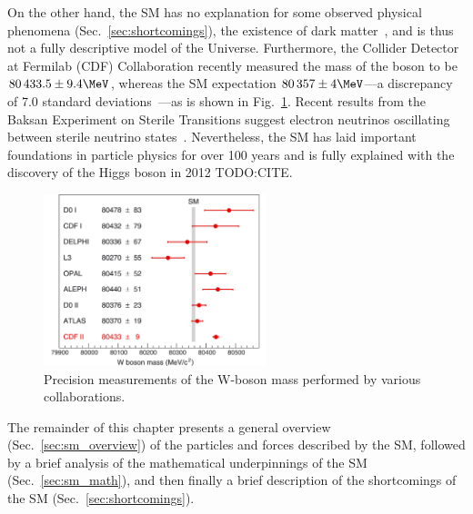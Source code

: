 On the other hand, the SM has no explanation for some observed physical phenomena (Sec.~\ref{sec:shortcomings}), \eg the existence of dark matter~\cite{particle_data_group_review_2020}, and is thus not a fully descriptive model of the Universe.
Furthermore, the Collider Detector at Fermilab (CDF) Collaboration recently measured the mass of the \PW boson to be $80\,433.5 \pm 9.4\MeV$, whereas the SM expectation $80\,357 \pm 4\MeV$---a discrepancy of 7.0 standard deviations~\cite{cdf_collaboration_high-precision_2022}---as is shown in Fig.~\ref{fig:wmass}.
Recent results from the Baksan Experiment on Sterile Transitions suggest electron neutrinos oscillating between sterile neutrino states~\cite{PhysRevLett.128.232501}.
Nevertheless, the SM has laid important foundations in particle physics for over 100 years and is fully explained with the discovery of the Higgs boson in 2012 TODO:CITE.
\begin{figure}[pbth]
    \centering
    \includegraphics[height=5cm,keepaspectratio]{figures/sm/wmass.pdf}
        \caption{Precision measurements of the W-boson mass performed by various collaborations.} 
        \label{fig:wmass}
    \end{figure}

The remainder of this chapter presents a general overview (Sec.~\ref{sec:sm_overview}) of the particles and forces described by the SM, followed by a brief analysis of the mathematical underpinnings of the SM (Sec.~\ref{sec:sm_math}), and then finally a brief description of the shortcomings of the SM (Sec.~\ref{sec:shortcomings}).


